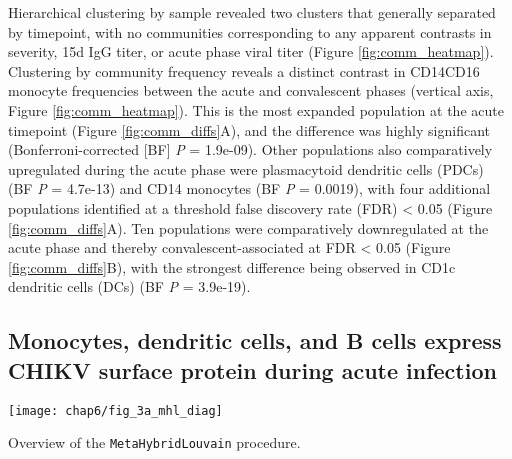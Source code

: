 Hierarchical clustering by sample revealed two clusters that generally separated by timepoint, with no communities corresponding to any apparent contrasts in severity, 15d IgG titer, or acute phase viral titer (Figure \ref{fig:comm_heatmap}). Clustering by community frequency reveals a distinct contrast in CD14\sups{+}\allowbreak CD16\sups{+} monocyte frequencies between the acute and convalescent phases (vertical axis, Figure \ref{fig:comm_heatmap}). This is the most expanded population at the acute timepoint (Figure \ref{fig:comm_diffs}A), and the difference was highly significant (Bonferroni-corrected [BF] \emph{P} = 1.9e-09). Other populations also comparatively upregulated during the acute phase were plasmacytoid dendritic cells (PDCs) (BF \emph{P} = 4.7e-13) and CD14\sups{+} monocytes (BF \emph{P} = 0.0019), with four additional populations identified at a threshold false discovery rate (FDR) < 0.05 (Figure \ref{fig:comm_diffs}A). Ten populations were comparatively downregulated at the acute phase and thereby convalescent-associated at FDR < 0.05 (Figure \ref{fig:comm_diffs}B), with the strongest difference being observed in CD1c dendritic cells (DCs) (BF \emph{P} = 3.9e-19).

\subsection{Monocytes, dendritic cells, and B cells express CHIKV surface protein during acute infection}

\begin{marginfigure}[-2cm]
  \centering
  \texttt{[image: chap6/fig\_3a\_mhl\_diag]}
  \vspace{1em}
  \caption[Overview of the \texttt{MetaHybridLouvain} procedure]{Overview of the \texttt{MetaHybridLouvain} procedure.}
  \label{fig:mhl_diag}
\end{marginfigure}

